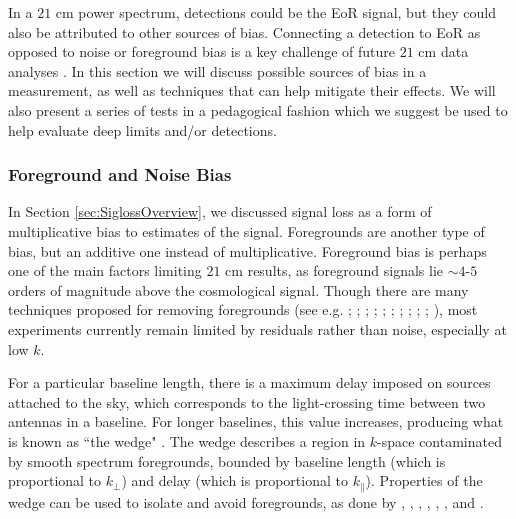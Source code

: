 \documentclass[preprint2,numberedappendix,tighten]{aastex6}  %
\begin{document}
In a $21$ cm power spectrum, detections could be the EoR signal, but they could also 
be attributed to other sources of bias. Connecting a detection to EoR as opposed to noise or foreground bias is a key challenge of 
future $21$ cm data analyses \citep[e.g.][]{petrovic_and_oh2011}. In this section we will discuss possible sources of bias in a measurement, as well as techniques 
that can help mitigate their effects. We will also present a series of tests in a pedagogical fashion which we suggest be used to 
help evaluate deep limits and/or detections.

\subsubsection{Foreground and Noise Bias}
\label{sec:BiasTypes}

In Section \ref{sec:SiglossOverview}, we discussed signal loss as a form of multiplicative bias to estimates of the signal. Foregrounds are another type of bias, but an additive one instead of multiplicative. Foreground bias is perhaps one of the main factors limiting $21$ cm results, as foreground signals lie $\sim4$-$5$ orders of 
magnitude above the cosmological signal. Though there are many techniques proposed for removing foregrounds (see e.g. \citealt{vedantham_et_al2012}; \citealt{parsons_et_al2012a}; \citealt{parsons_et_al2012b}; \citealt{dillon_et_al2013a}; \citealt{wang_et_al2013}; \citealt{parsons_et_al2014}; \citealt{liu_et_al2014a}; \citealt{liu_et_al2014b}; \citealt{dillon_et_al2015}; \citealt{pober_et_al2016a}; \citealt{trott_et_al2016}), most 
experiments currently remain limited by residuals rather than noise, especially at low $k$.

For a particular 
baseline length, there is a maximum delay imposed on sources attached to the sky, which corresponds to the light-crossing time between two 
antennas in a baseline. For longer baselines, this value increases, producing what is known as ``the 
wedge"
\citep{datta_et_al2010, parsons_et_al2012b, vedantham_et_al2012, pober_et_al2013, thyagarajan_et_al2013, liu_et_al2014a, liu_et_al2014b, patil_et_al2017}. 
The wedge describes a region in $k$-space contaminated by smooth spectrum foregrounds, bounded by baseline length (which is proportional to $k_{\perp}$) and delay (which is 
proportional to $k_{\parallel}$). Properties of the wedge can be used to isolate and 
avoid foregrounds, as done by , 
\citet{parsons_et_al2014}, \citet{dillon_et_al2014}, \citet{dillon_et_al2015}, \citet{jacobs_et_al2015}, \citet{beardsley_et_al2016}, and \citet{trott_et_al2016}.
\end{document}
